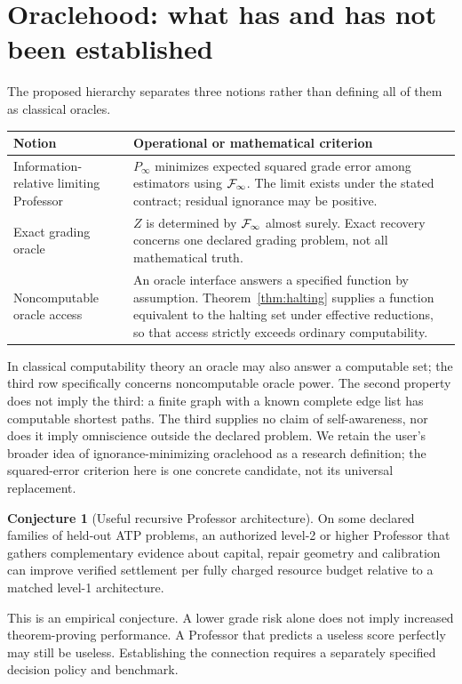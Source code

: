 \documentclass[11pt,letterpaper]{article}
\theoremstyle{definition}\newtheorem{definition}[theorem]{Definition}\newtheorem{example}[theorem]{Example}\newtheorem{conjecture}[theorem]{Conjecture}
\begin{document}
\section{Oraclehood: what has and has not been established}
The proposed hierarchy separates three notions rather than defining all of them as classical oracles.
\begin{center}
\begin{tabularx}{\linewidth}{@{}>{\raggedright\arraybackslash}p{.24\linewidth}>{\raggedright\arraybackslash}X@{}}
\toprule
Notion & Operational or mathematical criterion\\\midrule
Information-relative limiting Professor & $P_\infty$ minimizes expected squared grade error among estimators using $\mathcal F_\infty$. The limit exists under the stated contract; residual ignorance may be positive.\\
Exact grading oracle & $Z$ is determined by $\mathcal F_\infty$ almost surely. Exact recovery concerns one declared grading problem, not all mathematical truth.\\
Noncomputable oracle access & An oracle interface answers a specified function by assumption. Theorem~\ref{thm:halting} supplies a function equivalent to the halting set under effective reductions, so that access strictly exceeds ordinary computability.\\
\bottomrule
\end{tabularx}
\end{center}
In classical computability theory an oracle may also answer a computable set; the third row specifically concerns noncomputable oracle power. The second property does not imply the third: a finite graph with a known complete edge list has computable shortest paths. The third supplies no claim of self-awareness, nor does it imply omniscience outside the declared problem. We retain the user's broader idea of ignorance-minimizing oraclehood as a research definition; the squared-error criterion here is one concrete candidate, not its universal replacement.
\begin{conjecture}[Useful recursive Professor architecture]
On some declared families of held-out ATP problems, an authorized level-2 or higher Professor that gathers complementary evidence about capital, repair geometry and calibration can improve verified settlement per fully charged resource budget relative to a matched level-1 architecture.
\end{conjecture}
This is an empirical conjecture. A lower grade risk alone does not imply increased theorem-proving performance. A Professor that predicts a useless score perfectly may still be useless. Establishing the connection requires a separately specified decision policy and benchmark.
\end{document}
